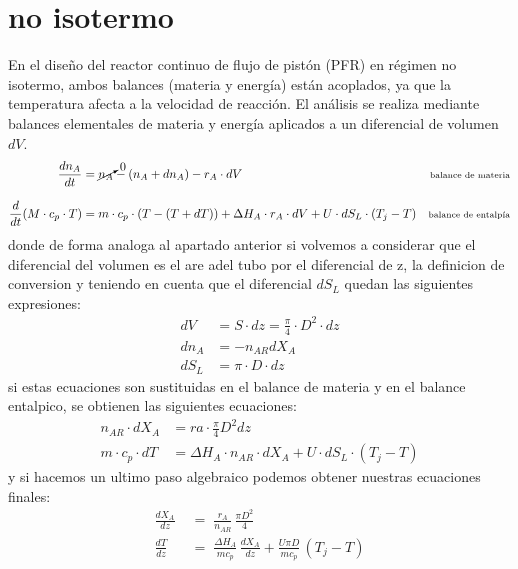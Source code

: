 \section{no isotermo}

\begin{flushleft}
    En el diseño del reactor continuo de flujo de pistón (PFR) en régimen no isotermo, ambos balances (materia y energía) están acoplados, ya que la temperatura afecta a la velocidad de reacción. El análisis se realiza mediante balances elementales de materia y energía aplicados a un diferencial de volumen $dV$.
    \begin{align}
        \frac{dn_A}{dt}                   & = \cancelto{0}{n_A} - (n_A + dn_A) - r_A \cdot dV                                               & \text{\scriptsize balance de materia}  \\[8pt]
        \frac{d}{dt}(M \cdot c_p \cdot T) & = m \cdot c_p \cdot (T - (T + dT)) + \Delta H_A \cdot r_A \cdot dV + U \cdot dS_L \cdot (T_j-T) & \text{\scriptsize balance de entalpía}
    \end{align}
    donde de forma analoga al apartado anterior si volvemos a considerar que el diferencial del volumen es el are adel tubo por el diferencial de z, la definicion de conversion y teniendo en cuenta que el diferencial $dS_L$  quedan las siguientes expresiones:
    \begin{align}
        dV   & =  S\cdot dz = \frac{\pi}{4}\cdot D^2\cdot dz \\
        dn_A & = - n_{AR}dX_A                                \\
        dS_L & = \pi\cdot D\cdot dz
    \end{align}
    si estas ecuaciones son sustituidas en el balance de materia y en el balance entalpico, se obtienen las siguientes ecuaciones:
    \begin{align}
        n_{AR} \cdot dX_A    & = ra \cdot \frac{\pi}{4}D^2dz                                     \\
        m \cdot c_p \cdot dT & = \Delta H_A \cdot n_{AR} \cdot dX_A + U \cdot dS_L \cdot (T_j-T)
    \end{align}
    y si hacemos un ultimo paso algebraico podemos obtener nuestras ecuaciones finales:
    \begin{align}
        \frac{dX_A}{dz}\; & =\; \frac{r_A}{n_{AR}}\,\frac{\pi D^2}{4}     \\
        \frac{dT}{dz}\;   & =\; \frac{\Delta H_A}{m c_p}\,\frac{dX_A}{dz}
        + \frac{U \pi D}{m c_p}\,(T_j - T)
    \end{align}

\end{flushleft}

